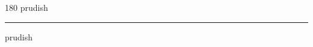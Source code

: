
\begin{frame}
\begin{center}
\begin{turn}{180}
{\fontsize{2.5cm}{1em}\selectfont prudish}
\end{turn}
\vspace{1em}\par  
\hrule
\vspace{1em}\par  
{\fontsize{2.5cm}{1em}\selectfont prudish}
\end{center}
\end{frame}
